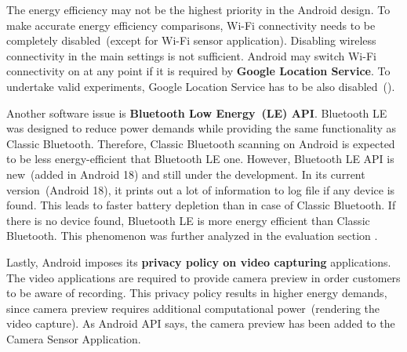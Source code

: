 The energy efficiency may not be the highest priority in the Android design. To make accurate energy efficiency comparisons, Wi-Fi connectivity needs to be completely disabled\ (except for Wi-Fi sensor application). Disabling wireless connectivity in the main settings is not sufficient. Android may switch Wi-Fi connectivity on at any point if it is required by \textbf{Google Location Service}. To undertake valid experiments, Google Location Service has to be also disabled\ (). 


Another software issue is \textbf{Bluetooth Low Energy\ (LE) API}. Bluetooth LE was designed to reduce power demands while providing the same functionality as Classic Bluetooth. Therefore, Classic Bluetooth scanning on Android is expected to be less energy-efficient that Bluetooth LE one. However, Bluetooth LE API is new\ (added in Android 18) and still under the development. In its current version\ (Android 18),  it prints out a lot of information to log file if any device is found. This leads to faster battery depletion than in case of Classic Bluetooth. If there is no device found, Bluetooth LE is more energy efficient than Classic Bluetooth. This phenomenon was further analyzed in the evaluation section . 

Lastly, Android imposes its \textbf{privacy policy on video capturing} applications. The video applications are required to provide camera preview in order customers to be aware of recording. This privacy policy results in higher energy demands, since camera preview requires additional computational power\ (rendering the video capture). As Android API says, the camera preview has been added to the Camera Sensor Application.
		
